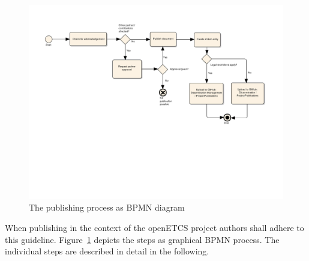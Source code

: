 \documentclass{template/openetcs_article}
\begin{document}
\begin{figure}
\includegraphics[trim=1.5cm 7cm 2cm 0,clip,width=\textwidth]{figs/publication_process_bpmn}
\caption{The publishing process as BPMN diagram}
\label{fig:process}
\end{figure}

When publishing in the context of the openETCS project authors shall adhere to this guideline. Figure~\ref{fig:process} depicts the steps as graphical BPMN process. The individual steps are described in detail in the following.
\end{document}

